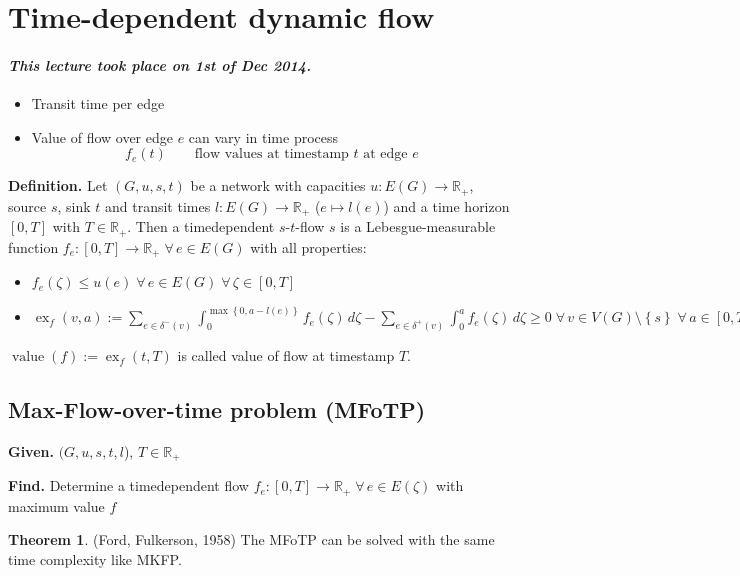 \documentclass[a4paper]{article}
\theoremstyle{definition}
\newtheorem{theorem}{Theorem}
\newcommand{\set}[1]{\left\{#1\right\}}
\newcommand{\given}[1]{\textbf{Given.} #1\par}
\newcommand{\find}[1]{\textbf{Find.} #1\par}
\newcommand{\dateref}[1]{\paragraph{\textit{This lecture took place on #1.}}}
\newcommand{\flow}[2]{$#1$-$#2$-flow}
\newcommand{\fall}{\;\forall\,}
\begin{document}
\section{Time-dependent dynamic flow}
%
\dateref{1st of Dec 2014}
\begin{itemize}
  \item Transit time per edge
  \item Value of flow over edge $e$ can vary in time process
    \[ f_e(t) \qquad \text{flow values at timestamp $t$ at edge $e$} \]
\end{itemize}

\textbf{Definition.}
  Let $(G, u, s, t)$ be a network with capacities $u: E(G) \rightarrow \mathbb{R}_+$, source $s$, sink $t$ and transit times $l: E(G) \rightarrow \mathbb{R}_+$ ($e \mapsto l(e)$) and a time horizon $[0, T]$ with $T \in \mathbb{R}_+$. Then a timedependent \flow st $s$ is a Lebesgue-measurable function $f_e: [0, T] \rightarrow \mathbb{R}_+ \fall e \in E(G)$ with all properties:
  \begin{itemize}
    \item $f_e(\zeta) \leq u(e) \fall e \in E(G) \fall \zeta \in [0, T]$
    \item $\operatorname{ex}_f(v, a) :=
      \sum_{e \in \delta^-(v)} \int_0^{\max\set{0, a-l(e)}} f_e(\zeta) \,d\zeta
      - \sum_{e \in \delta^+(v)} \int_0^a f_e(\zeta) \, d\zeta \geq 0
      \fall v \in V(G) \setminus \set{s} \fall a \in [0, T]$
  \end{itemize}

$\operatorname{value}(f) := \operatorname{ex}_f(t, T)$ is called value of flow at timestamp $T$.

\subsection{Max-Flow-over-time problem (MFoTP)}
\given{$(G, u, s, t, l$), $T \in \mathbb{R}_+$}
\find{Determine a timedependent flow $f_e: [0, T] \rightarrow \mathbb{R}_+ \fall e \in E(\zeta)$ with maximum value $f$}

\begin{theorem}\label{satz-5.21}
  (Ford, Fulkerson, 1958)
  The MFoTP can be solved with the same time complexity like MKFP.
\end{theorem}
\end{document}
